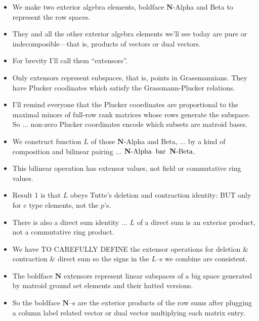 \documentclass[14pt]{extarticle}
\begin{document}
{\begin{itemize}
  \item We make two exterior algebra elements,  boldface
    $\mathbf{N}$-Alpha and Beta to represent the row spaces.


    \item They and all the 
      other exterior algebra elements we'll see today are
      pure or indecomposible---that is, products of vectors or dual vectors.


    \item For brevity I'll call them ``extensors''.


    \item Only extensors represent subspaces, that is, points in Grassmannians.
      They have Plucker coodinates which satisfy the Grassmann-Plucker relations.

      \item
        I'll remind everyone that the Plucker coordinates are proportional to the maximal minors of
        full-row rank matrices whose rows generate the subspace.  So ... non-zero Plucker coordinates encode
    which subsets are matroid bases.  

  \item We construct function $L$ of those
    $\mathbf{N}$-Alpha and Beta, ... by a
    kind of composition and bilinear pairing ... 
  $\mathbf{N}\text{-Alpha} \text{\;\;bar\;\;} \mathbf{N}\text{-Beta}$.

  \item This bilinear operation has extensor values,
    not field or commutative ring values. 

\item Result 1 is that $L$ obeys Tutte's deletion and contraction identity:  BUT
  only for $e$ type elements, not the $p$'s.  

\item There is also a direct sum identity ... $L$ of a direct sum is an exterior product, not
  a commutative ring product.

\item We have TO CAREFULLY DEFINE the extensor operations for deletion \&
  contraction \& direct sum so the signs in the $L$--s we combine are consistent.

\item
  The  boldface $\mathbf{N}$  extensors
   represent linear subspaces of a big space generated
  by matroid ground set elements and their hatted versions.  

\item
  So the boldface $\mathbf{N}$--s are the exterior products of the row sums
  after plugging a column label related vector or dual vector multiplying each matrix  entry.


\end{itemize}}
\end{document}
